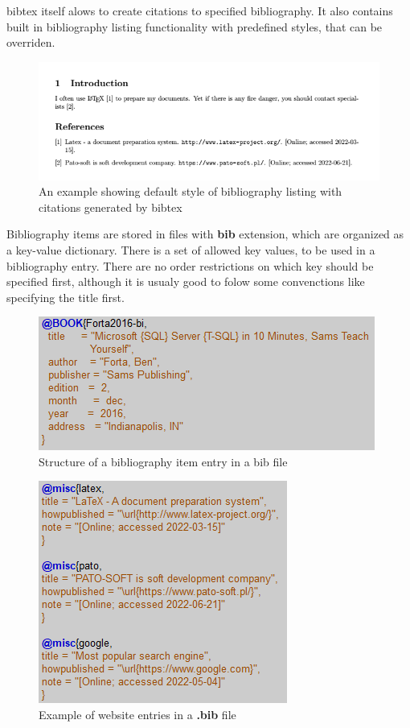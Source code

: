 \Gls{bibtex} itself alows to create citations to specified bibliography. It also contains built in bibliography listing functionality with predefined styles, that can be overriden.

\begin{figure}[H]
\centering
\includegraphics[scale=0.8]{content/LaTeX/figures/biblio_outcome.png}
\caption{An example showing default style of bibliography listing with citations generated by \gls{bibtex}}
\label{fig:bibliography_example}
\end{figure}

Bibliography items are stored in files with \textbf{\gls{bib}} extension, which are organized as a key-value dictionary. There is a set of allowed key values, to be used in a bibliography entry. There are no order restrictions on which key should be specified first, although it is usualy good to folow some convenctions like specifying the title first.

\begin{figure}[H]
\centering
\includegraphics[scale=0.9]{content/LaTeX/figures/biblio_example.png}
\caption{Structure of a bibliography item entry in a \gls{bib} file}
\label{fig:biblio_example}
\end{figure}

\begin{figure}[H]
\centering
\includegraphics[scale=0.9]{content/LaTeX/figures/biblio_bib.png}
\caption{Example of website entries in a \textbf{.bib} file}
\label{fig:biblio_websites}
\end{figure}

